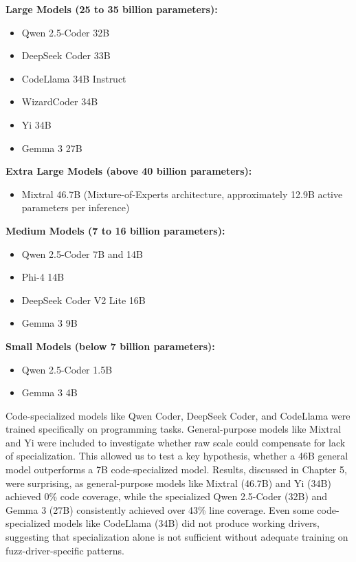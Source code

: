 \textbf{Large Models (25 to 35 billion parameters):}
\begin{itemize}
    \item Qwen 2.5-Coder 32B
    \item DeepSeek Coder 33B
    \item CodeLlama 34B Instruct
    \item WizardCoder 34B
    \item Yi 34B
    \item Gemma 3 27B
\end{itemize}

\textbf{Extra Large Models (above 40 billion parameters):}
\begin{itemize}
    \item Mixtral 46.7B (Mixture-of-Experts architecture, approximately 12.9B active parameters per inference)
\end{itemize}

\textbf{Medium Models (7 to 16 billion parameters):}
\begin{itemize}
    \item Qwen 2.5-Coder 7B and 14B
    \item Phi-4 14B
    \item DeepSeek Coder V2 Lite 16B
    \item Gemma 3 9B
\end{itemize}

\textbf{Small Models (below 7 billion parameters):}
\begin{itemize}
    \item Qwen 2.5-Coder 1.5B
    \item Gemma 3 4B
\end{itemize}

Code-specialized models like Qwen Coder, DeepSeek Coder, and CodeLlama were trained specifically on programming tasks. General-purpose models like Mixtral and Yi were included to investigate whether raw scale could compensate for lack of specialization. This allowed us to test a key hypothesis, whether a 46B general model outperforms a 7B code-specialized model. Results, discussed in Chapter 5, were surprising, as general-purpose models like Mixtral (46.7B) and Yi (34B) achieved 0\% code coverage, while the specialized Qwen 2.5-Coder (32B) and Gemma 3 (27B) consistently achieved over 43\% line coverage. Even some code-specialized models like CodeLlama (34B) did not produce working drivers, suggesting that specialization alone is not sufficient without adequate training on fuzz-driver-specific patterns.

